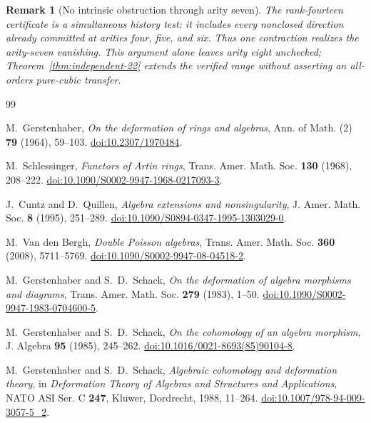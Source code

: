 \documentclass[11pt]{amsart}
\newtheorem{remark}[theorem]{Remark}
\begin{document}
\begin{remark}[No intrinsic obstruction through arity seven]\label{rem:no-obstruction-through-seven}
The rank-fourteen certificate is a simultaneous history test: it includes every
nonclosed direction already committed at arities four, five, and six. Thus one
contraction realizes the arity-seven vanishing. This argument alone leaves
arity eight unchecked; Theorem~\ref{thm:independent-22} extends the verified
range without asserting an all-orders pure-cubic transfer.
\end{remark}

\clearpage
\begin{thebibliography}{99}
\raggedright

M.~Gerstenhaber,
\emph{On the deformation of rings and algebras},
Ann. of Math. (2) \textbf{79} (1964), 59--103.
\href{https://doi.org/10.2307/1970484}{doi:10.2307/1970484}.

M.~Schlessinger,
\emph{Functors of Artin rings},
Trans. Amer. Math. Soc. \textbf{130} (1968), 208--222.
\href{https://doi.org/10.1090/S0002-9947-1968-0217093-3}{doi:10.1090/S0002-9947-1968-0217093-3}.

J.~Cuntz and D.~Quillen,
\emph{Algebra extensions and nonsingularity},
J. Amer. Math. Soc. \textbf{8} (1995), 251--289.
\href{https://doi.org/10.1090/S0894-0347-1995-1303029-0}{doi:10.1090/S0894-0347-1995-1303029-0}.

M.~Van den Bergh,
\emph{Double Poisson algebras},
Trans. Amer. Math. Soc. \textbf{360} (2008), 5711--5769.
\href{https://doi.org/10.1090/S0002-9947-08-04518-2}{doi:10.1090/S0002-9947-08-04518-2}.

M.~Gerstenhaber and S.~D.~Schack,
\emph{On the deformation of algebra morphisms and diagrams},
Trans. Amer. Math. Soc. \textbf{279} (1983), 1--50.
\href{https://doi.org/10.1090/S0002-9947-1983-0704600-5}{doi:10.1090/S0002-9947-1983-0704600-5}.

M.~Gerstenhaber and S.~D.~Schack,
\emph{On the cohomology of an algebra morphism},
J. Algebra \textbf{95} (1985), 245--262.
\href{https://doi.org/10.1016/0021-8693(85)90104-8}{doi:10.1016/0021-8693(85)90104-8}.

M.~Gerstenhaber and S.~D.~Schack,
\emph{Algebraic cohomology and deformation theory},
in \emph{Deformation Theory of Algebras and Structures and Applications},
NATO ASI Ser. C \textbf{247}, Kluwer, Dordrecht, 1988, 11--264.
\href{https://doi.org/10.1007/978-94-009-3057-5_2}{doi:10.1007/978-94-009-3057-5\_2}.


\end{thebibliography}
\end{document}
